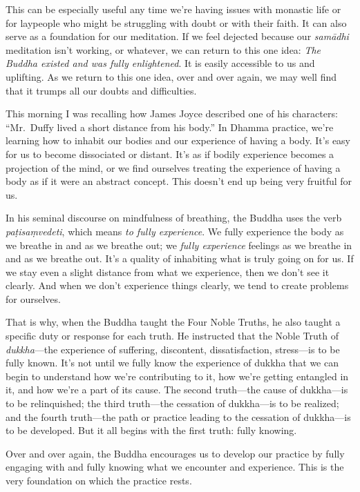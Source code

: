 This can be especially useful any time we're having issues with 
monastic life or for laypeople who might be struggling with doubt or 
with their faith. It can also serve as a foundation for our meditation. 
If we feel dejected because our \emph{samādhi} meditation isn't 
working, or whatever, we can return to this one idea: \emph{The Buddha 
existed and was fully enlightened}. It is easily accessible to us and 
uplifting. As we return to this one idea, over and over again, we may 
well find that it trumps all our doubts and difficulties.


This morning I was recalling how James Joyce described one of his 
characters: ``Mr. Duffy lived a short distance from his body.'' In 
Dhamma practice, we're learning how to inhabit our bodies and our 
experience of having a body. It's easy for us to become dissociated or 
distant. It's as if bodily experience becomes a projection of the mind, 
or we find ourselves treating the experience of having a body as if it 
were an abstract concept. This doesn't end up being very fruitful for 
us.

In his seminal discourse on mindfulness of breathing, the Buddha uses 
the verb \emph{paṭisaṃvedeti}, which means \emph{to fully 
experience}. We fully experience the body as we breathe in and as we 
breathe out; we \emph{fully experience} feelings as we breathe in and 
as we breathe out. It's a quality of inhabiting what is truly going on 
for us. If we stay even a slight distance from what we experience, then 
we don't see it clearly. And when we don't experience things clearly, 
we tend to create problems for ourselves.

That is why, when the Buddha taught the Four Noble Truths, he also 
taught a specific duty or response for each truth. He instructed that 
the Noble Truth of \emph{dukkha}---the experience of suffering, 
discontent, dissatisfaction, stress---is to be fully known. It's not 
until we fully know the experience of dukkha that we can begin to 
understand how we're contributing to it, how we're getting entangled in 
it, and how we're a part of its cause. The second truth---the cause of 
dukkha---is to be relinquished; the third truth---the cessation of 
dukkha---is to be realized; and the fourth truth---the path or practice 
leading to the cessation of dukkha---is to be developed. But it all 
begins with the first truth: fully knowing.

Over and over again, the Buddha encourages us to develop our practice 
by fully engaging with and fully knowing what we encounter and 
experience. This is the very foundation on which the practice rests.

